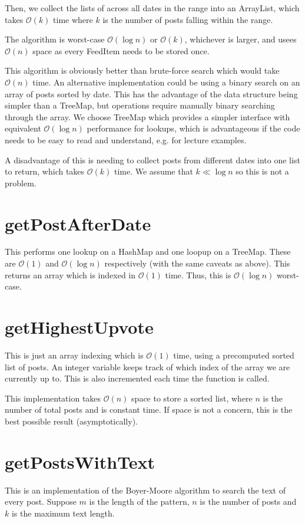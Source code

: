 \documentclass[11pt,a4paper]{article} %
\begin{document}
Then, we collect the lists of across all dates in the range into an ArrayList, which takes 
$\mathcal O(k)$ time where $k$ is the number of posts falling within the range.

The algorithm is worst-case $\mathcal O(\log n)$ or $\mathcal O(k)$, whichever is larger,
and usees $\mathcal O(n)$ space as every FeedItem needs to be stored once.

This algorithm is obviously better than brute-force search which 
would take $\mathcal O(n)$ time. An alternative implementation could be using a 
binary search on an array of posts sorted by date. This has the advantage of 
the data structure being simpler than a TreeMap, but operations require manually 
binary searching through the array. We choose TreeMap which provides 
a simpler interface with equivalent $\mathcal O(\log n)$ performance for lookups,
which is advantageous if the code needs to be easy to read and understand,
e.g. for lecture examples.

A disadvantage of this is needing to collect posts from different dates into one 
list to return, which takes $\mathcal O(k)$ time. We assume that $k \ll \log n$ 
so this is not a problem.


\section*{getPostAfterDate}
This performs one lookup on a HashMap and one loopup on a TreeMap. 
These are $\mathcal O(1)$ and $\mathcal O(\log n)$ respectively
(with the same caveats as above). This returns an array
which is indexed in $\mathcal O(1)$ time.
Thus, this is $\mathcal O(\log n)$ worst-case.

\section*{getHighestUpvote}
This is just an array indexing which is  $\mathcal O(1)$ time,
using a precomputed sorted list of posts. An integer variable keeps track of 
which index of the array we are currently up to. This is also incremented each time 
the function is called.

This implementation takes $\mathcal O(n)$ space to store a sorted list, 
where $n$ is the number of total 
posts and is constant time. If space is not a concern, this is the best possible 
result (asymptotically). 

\section*{getPostsWithText}
This is an implementation of the Boyer-Moore algorithm to search 
the text of every post. Suppose $m$ is the length of the  pattern,
 $n$ is the number of posts and $k$ is the maximum text length.
\end{document}

